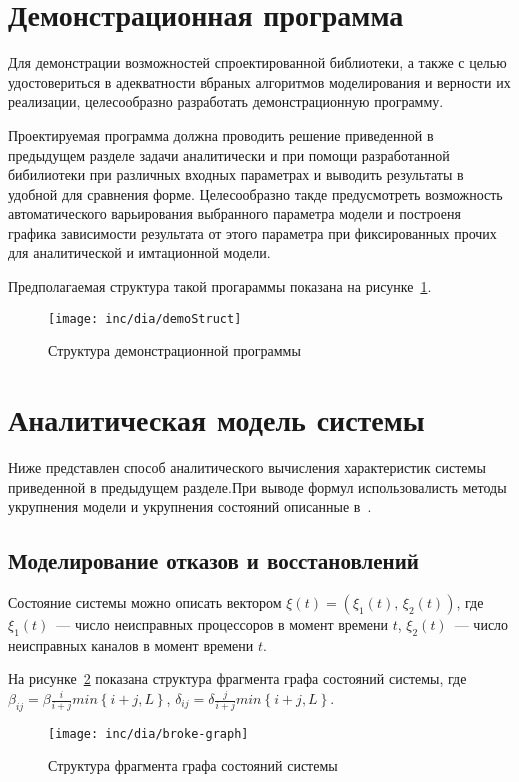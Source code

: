 \section{Демонстрационная программа}

Для демонстрации возможностей спроектированной библиотеки, а также с целью удостовериться  в адекватности вбраных алгоритмов моделирования и верности их реализации, целесообразно разработать демонстрационную программу. 

Проектируемая программа должна проводить решение приведенной в предыдущем разделе задачи аналитически и при помощи разработанной бибилиотеки при различных входных параметрах и выводить результаты в удобной для сравнения форме. Целесообразно такде предусмотреть возможность автоматического варьирования выбранного параметра модели и построеня графика зависимости результата от этого параметра при фиксированных прочих для аналитической и имтационной модели.

Предполагаемая структура такой прогараммы показана на рисунке~\ref{fig:demoStruct}.

\begin{figure}[ht]
  \centering
  \texttt{[image: inc/dia/demoStruct]}
  \caption{Структура демонстрационной программы}
  \label{fig:demoStruct}
\end{figure}

\section{Аналитическая модель системы}

Ниже представлен способ аналитического вычисления характеристик системы приведенной в предыдущем разделе.При выводе формул использовалисть методы укрупнения модели и укрупнения состояний описанные в~\cite{Kurov}.

\subsection{Моделирование отказов и восстановлений}
Состояние системы можно описать вектором $ \xi (t) = (\xi_{1}(t),\,\xi_{2}(t))$, где $\xi_{1}(t)$~--- число неисправных процессоров в момент времени $t$, $\xi_{2}(t)$~--- число неисправных каналов в момент времени $t$.

На рисунке~\ref{fig:broke-graph} показана структура фрагмента графа состояний системы, где $\beta_{ij}=\beta\frac{i}{i+j}min\left\lbrace i+j,L\right\rbrace$, $\delta_{ij}=\delta\frac{j}{i+j}min\left\lbrace i+j,L\right\rbrace$. 
\begin{figure}[ht]
\centering
\texttt{[image: inc/dia/broke-graph]}
\caption{Структура фрагмента графа состояний системы}
\label{fig:broke-graph}
\end{figure}

